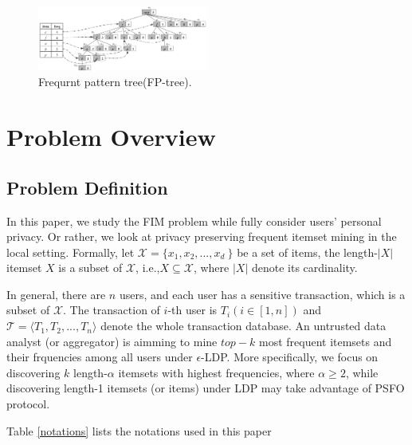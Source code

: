 \documentclass[conference]{IEEEtran}
\begin{document}
\begin{figure}[htbp]
\centerline{\includegraphics[width=0.5\textwidth]{tree.png}}
\caption{Frequrnt pattern tree(FP-tree).}
\label{fptree}
\end{figure}

\section{Problem Overview}

\subsection{Problem Definition}
In this paper, we study the FIM problem while fully consider users' personal privacy. Or rather, we look at privacy preserving frequent itemset mining in the local setting. Formally, let $\mathcal{X} = \{x_1,x_2,...,x_d\ \}$ be a set of items, the length-$|X|$ itemset $X$ is a subset of $\mathcal{X}$, i.e.,$X \subseteq \mathcal{X}$, where $|X|$ denote its cardinality.

In general, there are $n$ users, and each user has a sensitive transaction, which is a subset of $\mathcal{X}$. The transaction of $i$-th user is $T_i(i \in [1,n])$ and $\mathcal{T} = \langle T_1,T_2,...,T_n \rangle$ denote the whole transaction database. An untrusted data analyst (or aggregator) is aimming to mine $top-k$ most frequent itemsets and their frquencies among all users under $\epsilon$-LDP. More specifically, we focus on discovering $k$ length-$\alpha$ itemsets with highest frequencies, where $\alpha \geq 2$, while discovering length-1 itemsets (or items) under LDP may take advantage of PSFO protocol.

{\color{red}Table \ref{notations} lists the notations used in this paper}
\end{document}
